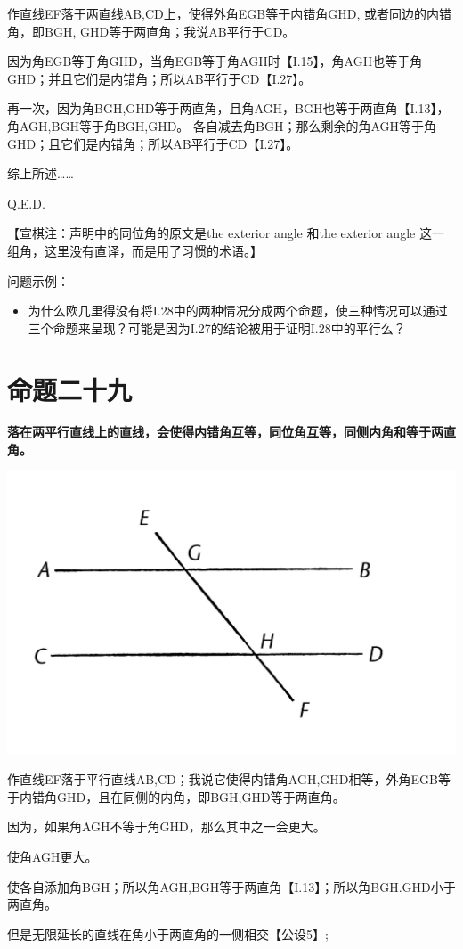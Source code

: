 \documentclass[
]{book}
\providecommand{\tightlist}{%
  \setlength{\itemsep}{0pt}\setlength{\parskip}{0pt}}
\begin{document}
作直线EF落于两直线AB,CD上，使得外角EGB等于内错角GHD, 或者同边的内错角，即BGH, GHD等于两直角；我说AB平行于CD。

因为角EGB等于角GHD，当角EGB等于角AGH时【I.15】，角AGH也等于角GHD；并且它们是内错角；所以AB平行于CD【I.27】。

再一次，因为角BGH,GHD等于两直角，且角AGH，BGH也等于两直角【I.13】，角AGH,BGH等于角BGH,GHD。
各自减去角BGH；那么剩余的角AGH等于角GHD；且它们是内错角；所以AB平行于CD【I.27】。

综上所述\ldots\ldots{}

Q.E.D.

【宣棋注：声明中的同位角的原文是the exterior angle 和the exterior angle 这一组角，这里没有直译，而是用了习惯的术语。】

问题示例：

\begin{itemize}
\tightlist
\item
  为什么欧几里得没有将I.28中的两种情况分成两个命题，使三种情况可以通过三个命题来呈现？可能是因为I.27的结论被用于证明I.28中的平行么？
\end{itemize}

\hypertarget{ux547dux9898ux4e8cux5341ux4e5d}{%
\section{命题二十九}\label{ux547dux9898ux4e8cux5341ux4e5d}}

\textbf{落在两平行直线上的直线，会使得内错角互等，同位角互等，同侧内角和等于两直角。}

\includegraphics[width=0.5\linewidth]{./image/img511}

作直线EF落于平行直线AB,CD；我说它使得内错角AGH,GHD相等，外角EGB等于内错角GHD，且在同侧的内角，即BGH,GHD等于两直角。

因为，如果角AGH不等于角GHD，那么其中之一会更大。

使角AGH更大。

使各自添加角BGH；所以角AGH,BGH等于两直角【I.13】；所以角BGH.GHD小于两直角。

但是无限延长的直线在角小于两直角的一侧相交【公设5】;
\end{document}
